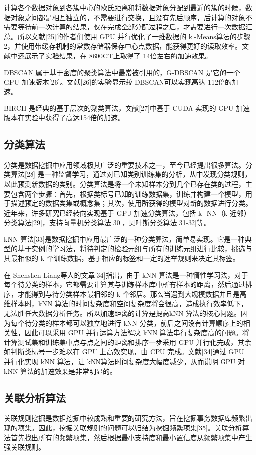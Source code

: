 \documentclass{article}
\begin{document}
\begin{multicols}{2}
    计算各个数据对象到各簇中心的欧氏距离和将数据对象分配到最近的簇的时候，数据对象之间都是相互独立的，不需要进行交换，且没有先后顺序，后计算的对象不需要等待前一次计算的结果，仅在完成全部分配过程之后，才需要进行一次数据汇总。所以文献[25]的作者们使用 GPU 并行优化了一维数据的 k -Means算法的步骤 2，并使用带缓存机制的常数存储器保存中心点数据，能获得更好的读取效率。文献中还展示了实验结果，在 8600GT上取得了 14倍左右的加速效果。

    DBSCAN 属于基于密度的聚类算法中最常被引用的，G-DBSCAN 是它的一个 GPU 加速版本[26]。文献[26]的实验显示较 DBSCAN可以实现高达 112倍的加速。

    BIRCH 是经典的基于层次的聚类算法，文献[27]中基于 CUDA 实现的 GPU 加速版本在实验中获得了高达154倍的加速。

    \subsection{分类算法}
    分类是数据挖掘中应用领域极其广泛的重要技术之一，至今已经提出很多算法。分类算法[28] 是一种监督学习，通过对已知类别训练集的分析，从中发现分类规则，以此预测新数据的类别。分类算法是将一个未知样本分到几个已存在类的过程，主要包含两个步骤：首先，根据类标号已知的训练数据集，训练并构建一个模型，用于描述预定的数据类集或概念集；其次，使用所获得的模型对新的数据进行分类。近年来，许多研究已经转向实现基于 GPU 加速分类算法，包括 k -NN（k 近邻）分类算法[29]，支持向量机分类算法[30]，贝叶斯分类算法[31-32]等。
    
    kNN 算法[33]是数据挖掘中应用最广泛的一种分类算法，简单易实现。它是一种典型的基于实例的学习法，将待判定的检验元组与所有的训练元组进行比较，挑选与其最相似的 k 个训练数据，基于相应的标签和一定的选举规则来决定其标签。

    在 Shenshen Liang等人的文章[34]指出，由于 kNN 算法是一种惰性学习法，对于每个待分类的样本，它都需要计算其与训练样本库中所有样本的距离，然后通过排序，才能得到与待分类样本最相邻的 k 个邻居。那么当遇到大规模数据并且是高维样本时，kNN 算法的时间复杂度和空间复杂度将会很高，造成执行效率低下，无法胜任大数据分析任务。所以加速距离的计算是提高kNN 算法的核心问题。因为每个待分类的样本都可以独立地进行 kNN 分类，前后之间没有计算顺序上的相关性，因此可以采用 GPU 并行运算方法解决 kNN 算法串行复杂度高的问题。将计算测试集和训练集中点与点之间的距离和排序一步采用 GPU 并行化完成，其余如判断类标号一步难以在 GPU 上高效实现，由 CPU 完成。文献[34]通过 GPU 并行化实现 kNN 算法，让 kNN算法时间复杂度大幅度减少，从而说明 GPU 对 kNN 算法的加速效果是非常明显的。

    \subsection{关联分析算法}
    关联规则挖掘是数据挖掘中较成熟和重要的研究方法，旨在挖掘事务数据库频繁出现的项集。因此，挖掘关联规则的问题可以归结为挖掘频繁项集[35]。关联分析算法首先找出所有的频繁项集，然后根据最小支持度和最小置信度从频繁项集中产生强关联规则。
    

\end{multicols}
\end{document}
